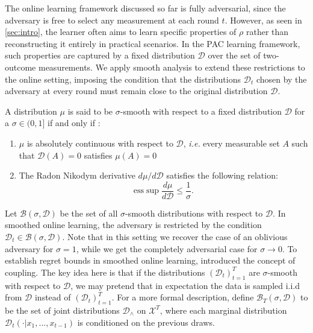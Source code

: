 

The online learning framework discussed so far is fully adversarial, since the adversary is free to select any measurement at each round $t$. However, as seen in \cref{sec:intro}, the learner often aims to learn specific properties of $\rho$ rather than reconstructing it entirely in practical scenarios. In the PAC learning framework, such properties are captured by a fixed distribution $\mathcal D$ over the set of two-outcome measurements. We apply smooth analysis to extend these restrictions to the online setting, imposing the condition that the distributions $\mathcal{D}_t$ chosen by the adversary at every round must remain close to the original distribution $\mathcal D$.


\begin{definition}
    A distribution $\mu$ is said to be $\sigma$-smooth with respect to a fixed distribution $\mathcal{D}$ for a $\sigma \in (0,1]$ if and only if \citep{smooth_distrib_def}:
\begin{enumerate}
    \item $\mu$ is absolutely continuous with respect to $\mathcal{D}$, {\it i.e.} every measurable set $A$ such that $\mathcal{D}(A) = 0$ satisfies $\mu(A) = 0$

    \item The Radon Nikodym derivative $d\mu/d\mathcal{D}$ satisfies the following relation:
\begin{equation}
    \text{ess} \sup \frac{d \mu}{d \mathcal{D}} \leq \frac{1}{\sigma}.
\end{equation}
\end{enumerate}
\end{definition}








Let $\mathcal{B}(\sigma, \mathcal{D})$ be the set of all $\sigma$-smooth distributions with respect to $\mathcal{D}$. In smoothed online learning, the adversary is restricted by the condition $\mathcal{D}_t \in \mathcal{B} (\sigma, \mathcal{D})$. Note that in this setting we recover the case of an oblivious adversary for $\sigma = 1$, while we get the completely adversarial case for $\sigma \rightarrow 0$. To establish regret bounds in smoothed online learning, \citet{Haghtalab2024, block2022smoothed} introduced the concept of coupling. The key idea here is that if the distributions $(\mathcal{D}_t)_{t=1}^T$ are $\sigma$-smooth with respect to $\mathcal{D}$, we may pretend that in expectation the data is sampled i.i.d from $\mathcal{D}$ instead of $(\mathcal{D}_t)_{t=1}^T$. For a more formal description, define $\mathcal{B}_T (\sigma, \mathcal{D})$ to be the set of joint distributions $\mathcal{D}_\wedge$ on $\mathcal{X}^T$, where each marginal distribution $\mathcal{D}_t(\cdot \vert x_1,...,x_{t-1})$ is conditioned on the previous draws. 

